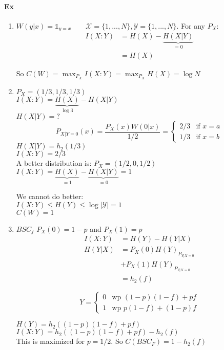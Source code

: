 \paragraph{Ex}
\begin{enumerate}
\item $W(y|x)=\mathbb{1}_{y=x}\qquad \mathcal{X}=\{1,...,N\}, \mathcal{Y}=\{1,...,N\}$.
For any $P_X$:
\begin{align*}
I(X:Y) &= H(X) - \underbrace{H(X|Y)}_{=0}\\
&= H(X)
\end{align*}

So $C(W)=\max_{P_X}I(X:Y) = \max_{P_X} H(X)=\log N$

\item 
$P_X=(1/3,1/3,1/3)$\\
$I(X:Y)=\underbrace{H(X)}_{\log 3} - H(X|Y)$\\
$H(X|Y)=?$
\[P_{X|Y=0}(x)=\frac{P_X(x)W(0|x)}{1/2}=
\begin{cases}
2/3 & \text{if $x=a$}\\
1/3 & \text{if $x=b$}
\end{cases}
\]
$H(X|Y)=h_2(1/3)$\\
$I(X:Y)=2/3$\\
A better distribution is: $P_X=(1/2,0,1/2)$\\
$I(X:Y)=\underbrace{H(X)}_{=1}-\underbrace{H(X|Y)}_{=0}=1$

We cannot do better:\\
$I(X:Y)\leq H(Y)\leq \log |\mathcal{Y}|=1$\\
$C(W)=1$

\item $BSC_f$ $P_X(0)=1-p$ and $P_X(1)=p$
\begin{align*}
I(X:Y) &=H(Y)-H(Y|X)\\
H(Y|X) &=P_X(0)H(Y)_{P_{Y|X=0}}\\
&+P_X(1)H(Y)_{P_{Y|X=0}}\\
& = h_2(f)
\end{align*}

\[Y= \begin{cases}
0 & \text{wp } (1-p)(1-f)+pf\\
1 & \text{wp } p(1-f)+(1-p)f
\end{cases}\]

$H(Y)=h_2\left( (1-p)(1-f)+pf \right)$\\
$I(X:Y)=h_2\left( (1-p)(1-f)+pf \right) - h_2(f)$\\
This is maximized for $p=1/2$. So $C(BSC_F)=1-h_2(f)$
\end{enumerate}


